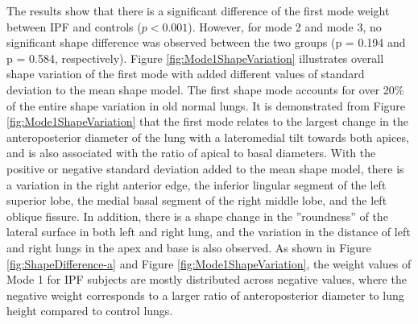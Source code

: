 
The results show that there is a significant difference of the first mode weight between IPF and controls ($p<0.001$). However, for mode 2 and mode 3, no significant shape difference was observed between the two groups (p = 0.194 and p = 0.584, respectively). Figure \ref{fig:Mode1ShapeVariation} illustrates overall shape variation of the first mode with added different values of standard deviation to the mean shape model. The first shape mode accounts for over 20\% of the entire shape variation in old normal lungs. It is demonstrated from Figure \ref{fig:Mode1ShapeVariation} that the first mode relates to the largest change in the anteroposterior diameter of the lung with a lateromedial tilt towards both apices, and is also associated with the ratio of apical to basal diameters. With the positive or negative standard deviation added to the mean shape model, there is a variation in the right anterior edge, the inferior lingular segment of the left superior lobe, the medial basal segment of the right middle lobe, and the left oblique fissure. In addition, there is a shape change in the ''roundness'' of the lateral surface in both left and right lung, and the variation in the distance of left and right lungs in the apex and base is also observed. As shown in Figure \ref{fig:ShapeDifference-a} and Figure \ref{fig:Mode1ShapeVariation}, the weight values of Mode 1 for IPF subjects are mostly distributed across negative values, where the negative weight corresponds to a larger ratio of anteroposterior diameter to lung height compared to control lungs. 

